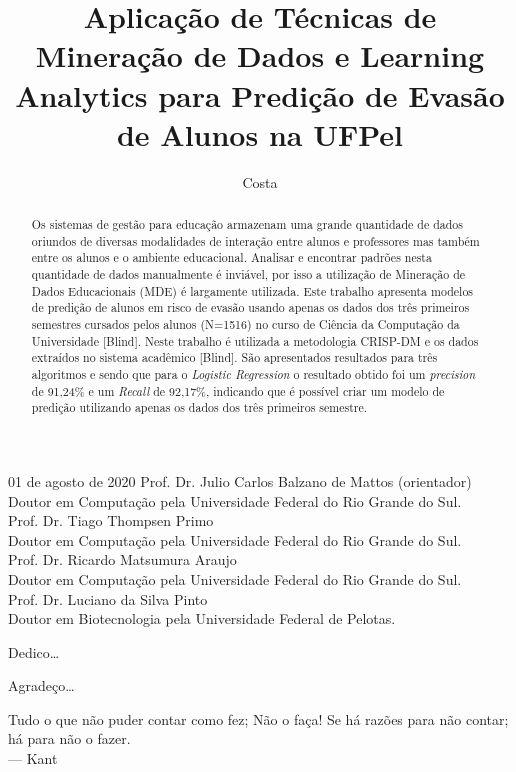\documentclass[diss,capa]{texufpel}
\title{Aplicação de Técnicas de Mineração de Dados e Learning Analytics para Predição de Evasão de Alunos na UFPel}
\author{Costa}{Alexandre Gomes da}
\begin{document}
\maketitle 

\sloppy

\fichacatalografica

\begin{aprovacao}{01 de agosto de 2020} %
\noindent Prof. Dr. Julio Carlos Balzano de Mattos (orientador)\\
Doutor em Computação pela Universidade Federal do Rio Grande do Sul.\\[1cm]

\noindent Prof. Dr. Tiago Thompsen Primo\\
Doutor em Computação pela Universidade Federal do Rio Grande do Sul.\\[1cm]

\noindent Prof. Dr. Ricardo Matsumura Araujo\\
Doutor em Computação pela Universidade Federal do Rio Grande do Sul.\\[1cm]

\noindent Prof. Dr. Luciano da Silva Pinto\\
Doutor em Biotecnologia pela Universidade Federal de Pelotas.
\end{aprovacao}

\begin{dedicatoria}
  Dedico\ldots 
\end{dedicatoria}

\begin{agradecimentos}
  Agradeço\ldots 
\end{agradecimentos}

\begin{epigrafe}
  Tudo o que não puder contar como fez; Não o faça! Se há razões para não contar; há para não o fazer.\\
  {\sc --- Kant}
\end{epigrafe}

\begin{abstract}
 Os sistemas de gestão para educação armazenam uma grande quantidade de dados oriundos de diversas modalidades de interação entre alunos e professores mas também entre os alunos e o ambiente educacional. Analisar e encontrar padrões nesta quantidade de dados manualmente é inviável, por isso a utilização de Mineração de Dados Educacionais (MDE) é largamente utilizada. Este trabalho apresenta modelos de predição de alunos em risco de evasão usando apenas os dados dos três primeiros semestres cursados pelos alunos (N=1516) no curso de Ciência da Computação da Universidade [Blind]. Neste trabalho é utilizada a metodologia CRISP-DM e os dados extraídos no sistema acadêmico [Blind]. São apresentados resultados para três algoritmos e sendo que para o \textit{Logistic Regression} o resultado obtido foi um \textit{precision} de 91,24\% e um \textit{Recall} de 92,17\%, indicando que é possível criar um modelo de predição utilizando apenas os dados dos três primeiros semestre.
\end{abstract}
\end{document}
